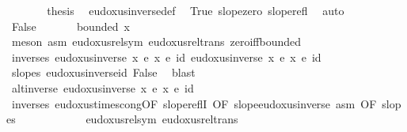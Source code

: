 \begin{isabellebody}
\ \ \ \ \isamarkupfalse%
\ \isamarkupfalse%
\ {\isacharquery}{\kern0pt}thesis\ \isamarkupfalse%
\ eudoxus{\isacharunderscore}{\kern0pt}inverse{\isacharunderscore}{\kern0pt}def\ \isamarkupfalse%
\ True\ slope{\isacharunderscore}{\kern0pt}zero\ slope{\isacharunderscore}{\kern0pt}refl\ \isamarkupfalse%
\ auto\isanewline
\ \ \isamarkupfalse%
\isanewline
\ \ \ \ \isamarkupfalse%
\ False\isanewline
\ \ \ \ \isamarkupfalse%
\ {\isachardoublequoteopen}{\isasymnot}\ bounded\ x{\isacharprime}{\kern0pt}{\isachardoublequoteclose}\ \isamarkupfalse%
\ {\isacharparenleft}{\kern0pt}meson\ asm\ eudoxus{\isacharunderscore}{\kern0pt}rel{\isacharunderscore}{\kern0pt}sym\ eudoxus{\isacharunderscore}{\kern0pt}rel{\isacharunderscore}{\kern0pt}trans\ zero{\isacharunderscore}{\kern0pt}iff{\isacharunderscore}{\kern0pt}bounded{\isacharparenright}{\kern0pt}\isanewline
\ \ \ \ \isamarkupfalse%
\ inverses{\isacharcolon}{\kern0pt}\ {\isachardoublequoteopen}eudoxus{\isacharunderscore}{\kern0pt}inverse\ x\ {\isacharasterisk}{\kern0pt}\isactrlsub e\ x\ {\isasymsim}\isactrlsub e\ id{\isachardoublequoteclose}\ {\isachardoublequoteopen}eudoxus{\isacharunderscore}{\kern0pt}inverse\ x{\isacharprime}{\kern0pt}\ {\isacharasterisk}{\kern0pt}\isactrlsub e\ x{\isacharprime}{\kern0pt}\ {\isasymsim}\isactrlsub e\ id{\isachardoublequoteclose}\ \isamarkupfalse%
\ slopes\ eudoxus{\isacharunderscore}{\kern0pt}inverse{\isacharunderscore}{\kern0pt}id\ False\ \isamarkupfalse%
\ blast{\isacharplus}{\kern0pt}\isanewline
\isanewline
\ \ \ \ \isamarkupfalse%
\ alt{\isacharunderscore}{\kern0pt}inverse{\isacharcolon}{\kern0pt}\ {\isachardoublequoteopen}eudoxus{\isacharunderscore}{\kern0pt}inverse\ x\ {\isacharasterisk}{\kern0pt}\isactrlsub e\ x{\isacharprime}{\kern0pt}\ {\isasymsim}\isactrlsub e\ id{\isachardoublequoteclose}\ \isanewline
\ \ \ \ \ \ \isamarkupfalse%
\ inverses\ eudoxus{\isacharunderscore}{\kern0pt}times{\isacharunderscore}{\kern0pt}cong{\isacharbrackleft}{\kern0pt}OF\ slope{\isacharunderscore}{\kern0pt}reflI{\isacharcomma}{\kern0pt}\ OF\ slope{\isacharunderscore}{\kern0pt}eudoxus{\isacharunderscore}{\kern0pt}inverse\ asm{\isacharcomma}{\kern0pt}\ OF\ slopes{\isacharparenleft}{\kern0pt}{}{\isacharparenright}{\kern0pt}{\isacharbrackright}{\kern0pt}\isanewline
\ \ \ \ \ \ \ \ \ \ \ \ eudoxus{\isacharunderscore}{\kern0pt}rel{\isacharunderscore}{\kern0pt}sym\ eudoxus{\isacharunderscore}{\kern0pt}rel{\isacharunderscore}{\kern0pt}trans\ \isamarkupfalse%

\end{isabellebody}
